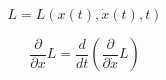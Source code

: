 \documentclass[10pt,a4paper]{article}
\begin{document}
\begin{equation*}
L = L\left( x\left(t\right) , \dot{x}\left(t\right) , t \right)
\end{equation*}

\begin{equation*}
\frac{\partial}{\partial x} L = \frac{d}{d t} \left( \frac{\partial}{\partial \dot{x}} L \right)
\end{equation*}
\end{document}
